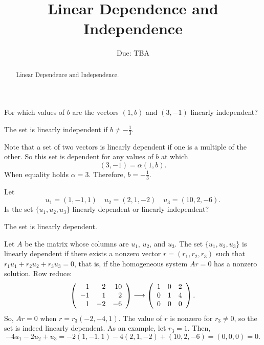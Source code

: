 \documentclass{ximera}
\title{Linear Dependence and Independence}
\author{\phantom{Dr. Golubitsky}}
\date{Due: TBA}
\begin{document}
\begin{abstract}
Linear Dependence and Independence.  
\end{abstract}
\maketitle



\problemlabel



\begin{exercise} \label{c5.4.2}
For which values of $b$ are the vectors $(1,b)$ and $(3,-1)$
linearly independent?

\begin{solution}

\ans The set is linearly independent if $b \neq -\frac{1}{3}$.

\soln Note that a set of two vectors is linearly dependent if one is
a multiple of the other.  So this set is dependent for any values of
$b$ at which
\[
(3,-1) = \alpha(1,b).
\]
When equality holds $\alpha = 3$.  Therefore, $b = -\frac{1}{3}$.  

\end{solution}
\end{exercise}




\problemlabel

\begin{exercise} \label{c5.4.3}
Let
\[
u_1=(1,-1,1) \quad u_2=(2,1,-2) \quad u_3 = (10,2,-6).
\]
Is the set $\{u_1,u_2,u_3\}$ linearly dependent or linearly independent?

\begin{solution}

\ans The set is linearly dependent.

\soln Let $A$ be the matrix whose columns are $u_1$, $u_2$, and $u_3$. 
The set $\{u_1,u_2,u_3\}$ is linearly dependent if there exists
a nonzero vector $r = (r_1,r_2,r_3)$ such that $r_1u_1 + r_2u_2 +
r_3u_3 = 0$, that is, if the homogeneous system $Ar = 0$ has a
nonzero solution.  Row reduce:
\[
\left(\begin{array}{rrr} 1 & 2 & 10 \\ -1 & 1 & 2 \\ 1 & -2 & -6\end{array}\right) \longrightarrow
\left(\begin{array}{rrr} 1 & 0 & 2 \\ 0 & 1 & 4 \\ 0 & 0 & 0\end{array}\right).
\]
So, $Ar = 0$ when $r = r_3(-2,-4,1)$.
The value of $r$ is nonzero for $r_3 \neq 0$, so the set is indeed
linearly dependent.
As an example, let $r_3 = 1$.  Then,
\[
-4u_1 - 2u_2 + u_3 = -2(1,-1,1) - 4(2,1,-2) + (10,2,-6) =
(0,0,0) = 0.
\]

\end{solution}
\end{exercise}
\end{document}
